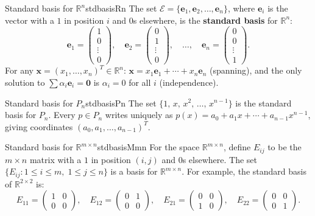\documentclass[12pt,a4paper]{article}
\newcommand{\R}{\mathbb{R}}
\newcommand{\vv}[1]{\mathbf{#1}}
\newcommand{\vzero}{\mathbf{0}}
\begin{document}
		\begin{example}{Standard basis for $\R^n$}{stdbasisRn}
			The set $\mathcal{E} = \{\vv{e}_1, \vv{e}_2, \ldots, \vv{e}_n\}$, where
			$\vv{e}_i$ is the vector with a $1$ in position $i$ and $0$s elsewhere,
			is the \textbf{standard basis} for $\R^n$:
			\[
			\vv{e}_1 = \begin{pmatrix}1\\0\\\vdots\\0\end{pmatrix},\quad
			\vv{e}_2 = \begin{pmatrix}0\\1\\\vdots\\0\end{pmatrix},\quad
			\ldots,\quad
			\vv{e}_n = \begin{pmatrix}0\\0\\\vdots\\1\end{pmatrix}.
			\]
			For any $\vv{x} = (x_1, \ldots, x_n)^T \in \R^n$:
			$\vv{x} = x_1\vv{e}_1 + \cdots + x_n\vv{e}_n$ (spanning),
			and the only solution to $\sum \alpha_i\vv{e}_i = \vzero$ is
			$\alpha_i = 0$ for all $i$ (independence).
		\end{example}
		
		\begin{example}{Standard basis for $P_n$}{stdbasisPn}
			The set $\{1,\, x,\, x^2,\, \ldots,\, x^{n-1}\}$ is the standard basis for
			$P_n$.  Every $p \in P_n$ writes uniquely as
			$p(x) = a_0 + a_1 x + \cdots + a_{n-1}x^{n-1}$, giving
			coordinates $(a_0, a_1, \ldots, a_{n-1})^T$.
		\end{example}
		
		\begin{example}{Standard basis for $\R^{m \times n}$}{stdbasisMmn}
			For the space $\R^{m\times n}$, define $E_{ij}$ to be the $m\times n$ matrix
			with a $1$ in position $(i,j)$ and $0$s elsewhere.  The set
			$\{E_{ij} : 1 \leq i \leq m,\; 1 \leq j \leq n\}$ is a basis for $\R^{m\times n}$.
			For example, the standard basis of $\R^{2\times 2}$ is:
			\[
			E_{11}=\begin{pmatrix}1&0\\0&0\end{pmatrix},\quad
			E_{12}=\begin{pmatrix}0&1\\0&0\end{pmatrix},\quad
			E_{21}=\begin{pmatrix}0&0\\1&0\end{pmatrix},\quad
			E_{22}=\begin{pmatrix}0&0\\0&1\end{pmatrix}.
			\]
		\end{example}
		
\end{document}

